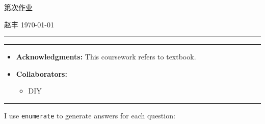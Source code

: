 \documentclass[a4paper]{article}
\begin{document}
\courseheader

\setcounter{hwcnt}{4} %

\begin{center}
  \underline{第\thehwcnt 次作业} \\
\end{center}
\begin{flushleft}
  赵丰\quad \studentID\hfill
  \today
\end{flushleft}
\hrule

\vspace{2em}

\flushleft
\rule{\textwidth}{1pt}
\begin{itemize}
\item {\bf Acknowledgments: \/} 
  This coursework refers to textbook.  
\item {\bf Collaborators: \/}
  \begin{itemize}
  \item DIY
  \end{itemize}
\end{itemize}
\rule{\textwidth}{1pt}

\vspace{2em}

I use \texttt{enumerate} to generate answers for each question:
\end{document}
